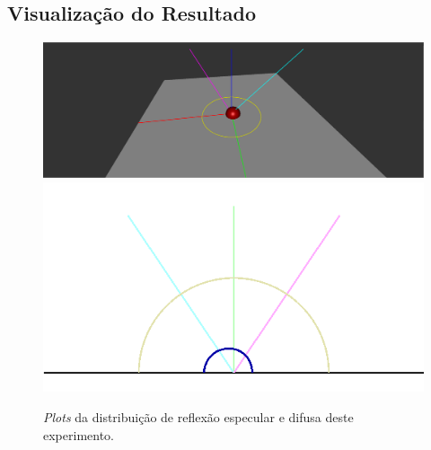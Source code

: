 \subsection{Visualização do Resultado}
\begin{figure}[H]
    \caption{\small{\textit{Plots} da distribuição de reflexão especular e difusa deste experimento.}}
    \label{fig-oren-nayar-plots}
    \vspace{42px}
  \includegraphics[width=\linewidth]{./Imagens/brdfs/oren-nayar-3D-plot}
\endminipage\hfill
{}
  \includegraphics[width=\linewidth]{./Imagens/brdfs/oren-nayar-polar-plot.png}
\endminipage\hfill
\end{figure}

